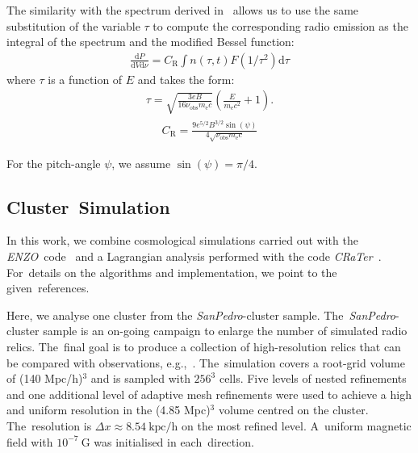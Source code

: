 \documentclass[galaxies,article,accept,moreauthors,pdftex]{mdpi}
\newcommand{\enzo}{{\it {\small ENZO}}}
\newcommand{\CRaTer}{{\it {\small CRaTer}}}
\newcommand{\dd}{\mathrm{d}}
\newcommand{\kpc}{\mathrm{kpc}}
\newcommand{\nuobs}{\nu_{\mathrm{obs}}}
\newcommand{\me}{m_\mathrm{e}}
\begin{document}
The similarity with the spectrum derived in~\cite{2007MNRAS.375...77H} allows us to use the same substitution of the variable $\tau$ to compute the corresponding radio emission as the integral of the spectrum and the modified Bessel function:
\begin{align}
 \frac{\dd P}{\dd V \dd \nu} = C_\mathrm{R} \int n(\tau,t) F(1/\tau^2) \dd \tau \label{eq::dPdVdv}
\end{align}
where $\tau$ is a function of $E$ and takes the form:
\begin{align}
 \tau = \sqrt{\frac{3 e B}{16 \nuobs \me c}} \left(\frac{E}{\me c^2} + 1 \right).
\end{align}
\begin{align}
 C_\mathrm{R} = \frac{9 e^{5/2} B^{3/2} \sin(\psi)}{4 \sqrt{\nuobs \me c}}
\end{align}

For the pitch-angle $\psi$, we assume $\sin (\psi) = \pi / 4$.




\subsection{Cluster~Simulation}\label{ssec::simus}

In this work, we combine cosmological simulations carried out with the \enzo \ code~\cite{ENZO_2014} and a Lagrangian analysis performed with the code \CRaTer \ \cite{2017MNRAS.464.4448W}. For~details on the algorithms and implementation, we point to the given~references.



Here, we analyse one cluster from the \textit{SanPedro}-cluster sample. The~\textit{SanPedro}-cluster sample is an on-going campaign to enlarge the number of simulated radio relics. The~final goal is to produce a collection of high-resolution relics that can be compared with observations, e.g.,~\citep{Banfi2020,wittor2020gammas,wittor2021mach}. The~simulation covers a root-grid volume of (140 Mpc/h)$^3$ and is sampled with $256^3$ cells. Five levels of nested refinements and one additional level of adaptive mesh refinements were used to achieve a high and uniform resolution in the (4.85 Mpc)$^3$ volume centred on the cluster. The~resolution is $\Delta x \approx 8.54 \ \kpc/$h on the most refined level. A~uniform magnetic field with $10^{-7} \ \mathrm{G}$ was initialised in each~direction.
\end{document}
